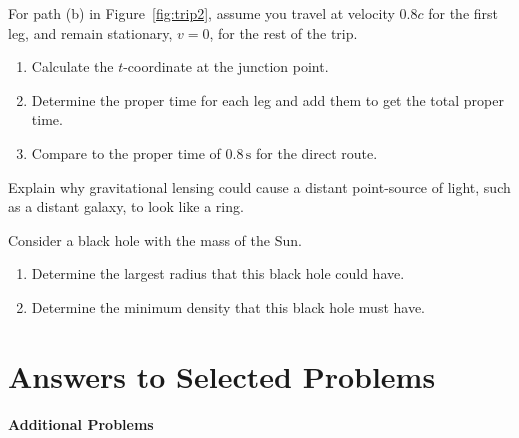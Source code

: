 \begin{exercise}
  For path (b) in Figure~\ref{fig:trip2}, assume you travel at velocity
  $0.8c$ for the first leg, and remain stationary, $v = 0$, for the rest
  of the trip.
  \begin{enumerate}
    \item Calculate the $t$-coordinate at the junction point.
    \item Determine the proper time for each leg and add them to get
      the total proper time.
    \item Compare to the proper time of $0.8\, \mbox{s}$ for the
      direct route.
  \end{enumerate}
  \label{prob:trip}
\end{exercise}



\begin{exercise}
  Explain why gravitational lensing could cause a distant point-source of
  light, such as a distant galaxy, to look like a ring.
\end{exercise}

\begin{exercise}
  Consider a black hole with the mass of the Sun.
  \begin{enumerate}
  \item Determine the largest radius that this black hole could have.
  \item Determine the minimum density that this black hole must have.
  \end{enumerate}
  \label{prob:black_hole}
\end{exercise}




\chapter*{Answers to Selected Problems}

 \textbf{Additional Problems}

